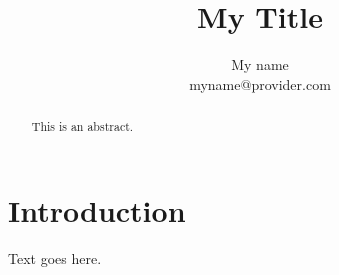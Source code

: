 \documentclass[11pt, letterpaper]{article}
\begin{document}
\title{My Title}

\author{My name\\myname@provider.com}

\maketitle

\begin{abstract}

This is an abstract.

\end{abstract}

\section{Introduction}

Text goes here.

%
\end{document}
